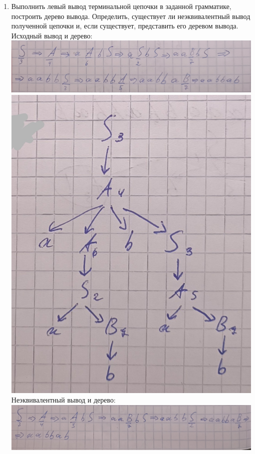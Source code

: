 \documentclass[a4paper,14pt]{extarticle}
\begin{document}
\begin{enumerate}[1.]
    \item Выполнить левый вывод терминальной цепочки в заданной грамматике, построить дерево вывода.
          Определить, существует ли неэквивалентный вывод полученной цепочки и, если существует, представить его деревом вывода.\bigbreak
          Исходный вывод и дерево:\\
          \includegraphics[width=140mm]{task2_origin}\\
          \includegraphics[width=140mm]{task2_origin_tree}\\
          Неэквивалентный вывод и дерево:\\
          \includegraphics[width=140mm]{task2_alternative}\\

\end{enumerate}
\end{document}
